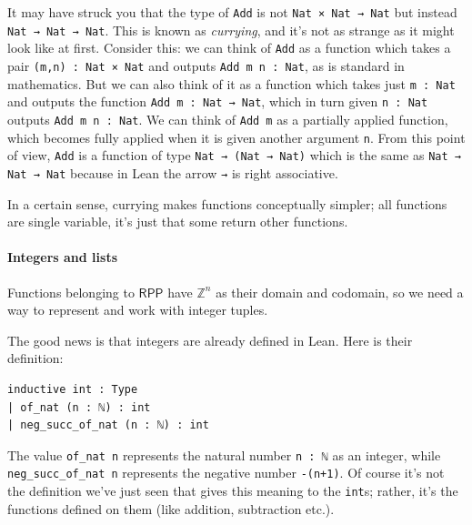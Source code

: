 \documentclass{book}
\theoremstyle{definition}
\theoremstyle{remark}
\theoremstyle{plain}
\newcommand{\ZZ}{\mathbb{Z}}
\newcommand{\RPP}{\mathsf{RPP}}
\begin{document}
It may have struck you that the type of \lstinline{Add} is not \lstinline{Nat × Nat → Nat}
but instead \lstinline{Nat → Nat → Nat}.
This is known as \textit{currying}, and it's not as strange as it might look like at first.
Consider this: we can think of \lstinline{Add} as a function which takes a pair \lstinline{(m,n) : Nat × Nat} and outputs \lstinline{Add m n : Nat},
as is standard in mathematics.
But we can also think of it as a function which takes just \lstinline{m : Nat} and outputs the function \lstinline{Add m : Nat → Nat},
which in turn given \lstinline{n : Nat} outputs \lstinline{Add m n : Nat}.
We can think of \lstinline{Add m} as a partially applied function, which becomes fully applied when it is given another argument \lstinline{n}.
From this point of view, \lstinline{Add} is a function of type \lstinline{Nat → (Nat → Nat)} which is the same as
\lstinline{Nat → Nat → Nat} because in Lean the arrow \lstinline{→} is right associative.

In a certain sense, currying makes functions conceptually simpler;
all functions are single variable, it's just that some return other functions.

\paragraph{Integers and lists}
Functions belonging to $\RPP$ have $\ZZ^n$ as their domain and codomain,
so we need a way to represent and work with integer tuples.

The good news is that integers are already defined in Lean.
Here is their definition:
\begin{lstlisting}
inductive int : Type
| of_nat (n : ℕ) : int
| neg_succ_of_nat (n : ℕ) : int  
\end{lstlisting}
The value \lstinline{of_nat n} represents the natural number \lstinline{n : ℕ} as an integer,
while \lstinline{neg_succ_of_nat n} represents the negative number \lstinline{-(n+1)}.
Of course it's not the definition we've just seen that gives this meaning to the \lstinline{int}s;
rather, it's the functions defined on them (like addition, subtraction etc.).
\end{document}
